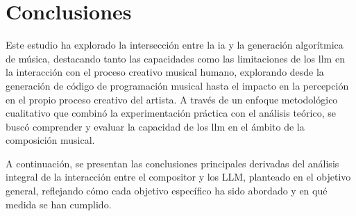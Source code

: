 \chapter{Conclusiones}



Este estudio ha explorado la intersección entre la \gls{ia} y la generación algorítmica de música, destacando tanto las capacidades como las limitaciones de los \gls{llm} en la interacción con el proceso creativo musical humano, explorando desde la generación de código de programación musical hasta el impacto en la percepción en el propio proceso creativo del artista. A través de un enfoque metodológico cualitativo que combinó la experimentación práctica con el análisis teórico, se buscó comprender y evaluar la capacidad de los \gls{llm} en el ámbito de la composición musical. 


A continuación, se presentan las conclusiones principales derivadas del análisis integral de la interacción entre el compositor y los LLM, planteado en el objetivo general, reflejando cómo cada objetivo específico ha sido abordado y en qué medida se han cumplido. 

